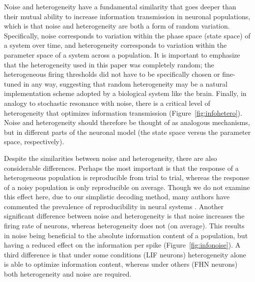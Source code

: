 \documentclass[12pt]{article}
\begin{document}
Noise and heterogeneity have a fundamental similarity that goes deeper than their mutual ability to increase information transmission in neuronal populations, which is that noise and heterogeneity are both a form of random variation. Specifically, noise corresponds to variation within the phase space (state space) of a system over time, and heterogeneity corresponds to variation within the parameter space of a system across a population. It is important to emphasize that the heterogeneity used in this paper was completely random; the heterogeneous firing thresholds did not have to be specifically chosen or fine-tuned in any way, suggesting that random heterogeneity may be a natural implementation scheme adopted by a biological system like the brain. Finally, in analogy to stochastic resonance with noise, there is a critical level of heterogeneity that optimizes information transmission (Figure~\ref{fig:infohetero}). Noise and heterogeneity should therefore be thought of as analogous mechanisms, but in different parts of the neuronal model (the state space versus the parameter space, respectively).

Despite the similarities between noise and heterogeneity, there are also considerable differences.
Perhaps the most important is that the response of a heterogeneous population is reproducible from trial to trial, whereas the response of a noisy population is only reproducible on average.
Though we do not examine this effect here, due to our simplistic decoding method,
many authors have commented the prevalence of reproducibility in neural systems \citep[e.g.,][]{Mainen1995}.
Another significant difference between noise and heterogeneity is that noise increases the firing rate of neurons, whereas heterogeneity does not (on average). This results in noise being beneficial to the absolute information content of a population, but having a reduced effect on the information per spike (Figure~\ref{fig:infonoise}).
A third difference is that under some conditions (LIF neurons) heterogeneity alone is able to optimize information content, whereas under others (FHN neurons) both heterogeneity and noise are required.
\end{document}
